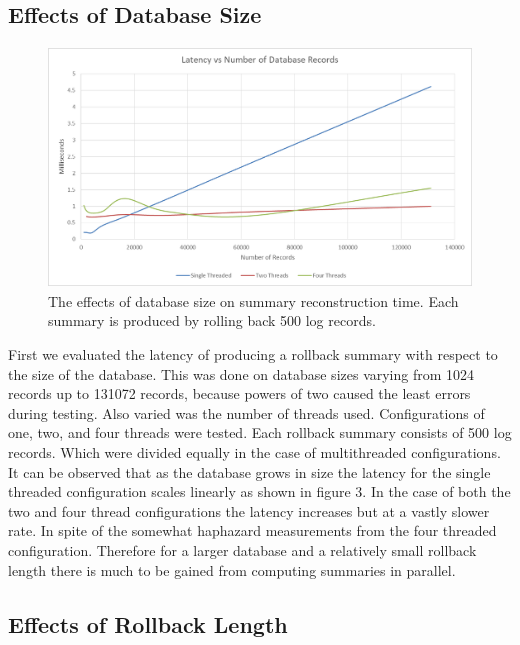 \documentclass{article}
\begin{document}

\subsection{Effects of Database Size}
\begin{figure}
    \centering
    \includegraphics[height=2.5in]{latencyvsrecords.png}
    \caption{The effects of database size on summary reconstruction time. Each summary is produced by rolling back 500 log records.}
    \label{fig:DatabaseSize}
\end{figure}

First we evaluated the latency of producing a rollback summary with respect to the size of the database. This was done on database sizes varying from 1024 records up to 131072 records, because powers of two caused the least errors during testing. Also varied was the number of threads used. Configurations of one, two, and four threads were tested. Each rollback summary consists of 500 log records. Which were divided equally in the case of multithreaded configurations. It can be observed that as the database grows in size the latency for the single threaded configuration scales linearly as shown in figure 3. In the case of both the two and four thread configurations the latency increases but at a vastly slower rate. In spite of the somewhat haphazard measurements from the four threaded configuration. Therefore for a larger database and a relatively small rollback length there is much to be gained from computing summaries in parallel.

\subsection{Effects of Rollback Length}
\end{document}
